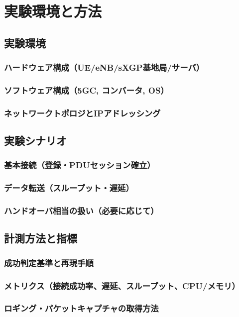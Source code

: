\chapter{実験環境と方法}
\label{chap:experiment}

\section{実験環境}
\subsection{ハードウェア構成（UE/eNB/sXGP基地局/サーバ）}
\subsection{ソフトウェア構成（5GC, コンバータ, OS）}
\subsection{ネットワークトポロジとIPアドレッシング}

\section{実験シナリオ}
\subsection{基本接続（登録・PDUセッション確立）}
\subsection{データ転送（スループット・遅延）}
\subsection{ハンドオーバ相当の扱い（必要に応じて）}

\section{計測方法と指標}
\subsection{成功判定基準と再現手順}
\subsection{メトリクス（接続成功率、遅延、スループット、CPU/メモリ）}
\subsection{ロギング・パケットキャプチャの取得方法}
